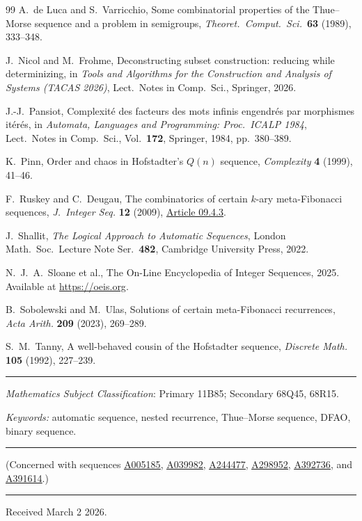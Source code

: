 \documentclass[12pt,reqno]{article}
\newcommand{\seqnum}[1]{\href{https://oeis.org/#1}{\rm \underline{#1}}}
\theoremstyle{plain}
\theoremstyle{definition}
\theoremstyle{remark}
\begin{document}
\begin{thebibliography}{99}
 A.\ de Luca and S.\ Varricchio,
Some combinatorial properties of the Thue--Morse sequence and a problem in semigroups,
\emph{Theoret.\ Comput.\ Sci.}\ \textbf{63} (1989), 333--348.

 J.\ Nicol and M.\ Frohme,
 Deconstructing subset construction: reducing while determinizing,
 in \emph{Tools and Algorithms for the Construction and Analysis of Systems
 (TACAS 2026)},
 Lect.\ Notes in Comp.\ Sci., Springer, 2026.

 J.-J.\ Pansiot, 
Complexit\'e des facteurs des mots infinis engendr\'es par morphismes it\'er\'es,
 in \emph{Automata, Languages and Programming: Proc.\ ICALP 1984},
 Lect.\ Notes in Comp.\ Sci., Vol.~\textbf{172},
 Springer, 1984, pp.~380--389.

 K.\ Pinn, 
 Order and chaos in {H}ofstadter's {$Q(n)$} sequence, 
 {\it Complexity} {\bf 4} (1999), 41--46. 

 F.\ Ruskey and C.\ Deugau, 
 The combinatorics of certain {$k$}-ary meta-{F}ibonacci sequences, 
 {\it J.\ Integer Seq.} {\bf 12} (2009), \href{https://cs.uwaterloo.ca/journals/JIS/VOL12/Ruskey/ruskey6.html}{Article 09.4.3}. 

 J.\ Shallit,
\emph{The Logical Approach to Automatic Sequences},
London Math.\ Soc.\ Lecture Note Ser.\ \textbf{482},
Cambridge University Press, 2022.

 N.\ J.\ A.\ Sloane et al.,
 The On-Line Encyclopedia of Integer Sequences, 2025. 
 Available at \url{https://oeis.org}.
 
 B.\ Sobolewski and M.\ Ulas, 
 Solutions of certain meta-{F}ibonacci recurrences, 
 {\it Acta Arith.} {\bf 209} (2023), 269--289. 

 S.\ M.\ Tanny, 
 A well-behaved cousin of the {H}ofstadter sequence, 
 {\it Discrete Math.} {\bf 105} (1992), 227--239. 

\end{thebibliography}

\bigskip
\hrule
\bigskip

 {\it Mathematics Subject Classification}:
 Primary 11B85; Secondary 68Q45, 68R15. 

\noindent \emph{Keywords: } 
 automatic sequence, nested recurrence, Thue--Morse sequence, DFAO, binary sequence. 

\bigskip
\hrule
\bigskip

\noindent (Concerned with sequences
\seqnum{A005185},
\seqnum{A039982},
\seqnum{A244477},
\seqnum{A298952},
\seqnum{A392736}, and
\seqnum{A391614}.)

\bigskip
\hrule
\bigskip

\vspace*{+.1in}
\noindent
 Received March 2 2026.
\end{document}
